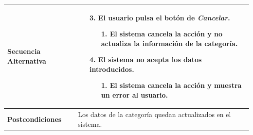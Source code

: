 \begin{longtable}{| p{4cm} | p{10cm} |}
\\
\hline
\textbf{Secuencia Alternativa} &\mbox{}\par\vspace{-\baselineskip}
\begin{enumerate}[leftmargin=0.9cm, topsep=0.1cm]
\item[3.] El usuario pulsa el botón de \textit{Cancelar}.
	\begin{itemize}
	\item[1.] El sistema cancela la acción y no actualiza la información de la categoría.
	\end{itemize}
\item[4.] El sistema no acepta los datos introducidos.
	\begin{itemize}
	\item[1.] El sistema cancela la acción y muestra un error al usuario.
	\end{itemize}
\end{enumerate}
\\

\hline
\textbf{Postcondiciones} & 
Los datos de la categoría quedan actualizados en el sistema.\\
\hline
\end{longtable}



\newpage
